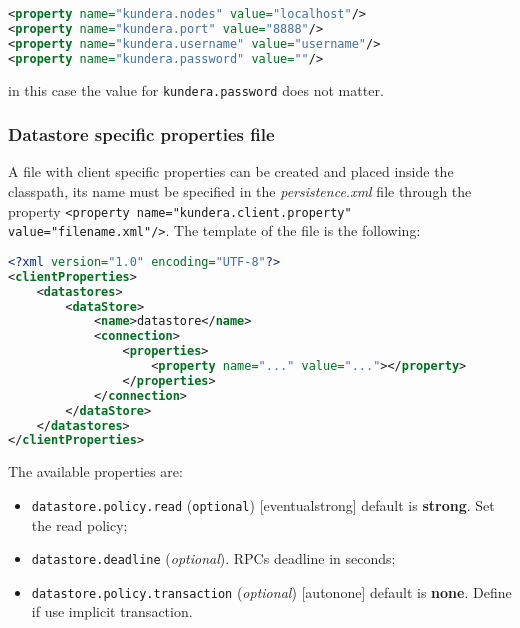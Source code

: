 \begin{lstlisting}[language=XML, caption=GAE Datastore emulator configuration]
<property name="kundera.nodes" value="localhost"/>
<property name="kundera.port" value="8888"/>
<property name="kundera.username" value="username"/>
<property name="kundera.password" value=""/>
\end{lstlisting}

\noindent in this case the value for \texttt{kundera.password} does not matter.

\subsubsection{Datastore specific properties file}
A file with client specific properties can be created and placed inside the classpath, its name must be specified in the \textit{persistence.xml} file through the property \texttt{<property name="kundera.client.property" value="filename.xml"/>}.
The template of the file is the following:

\begin{lstlisting}[language=XML, caption=GAE Datastore - datastore specific configuration]
<?xml version="1.0" encoding="UTF-8"?>
<clientProperties>
    <datastores>
        <dataStore>
            <name>datastore</name>
            <connection>
                <properties>
                    <property name="..." value="..."></property>
                </properties>
            </connection>
        </dataStore>
    </datastores>
</clientProperties>
\end{lstlisting}

\noindent The available properties are:
\begin{itemize}
\item \texttt{datastore.policy.read} (\texttt{optional}) [eventual\textbar strong] default is \textbf{strong}. Set the read policy;
\item \texttt{datastore.deadline} (\textit{optional}). RPCs deadline in seconds;
\item \texttt{datastore.policy.transaction} (\textit{optional}) [auto\textbar none] default is \textbf{none}. Define if use implicit transaction.
\end{itemize}

